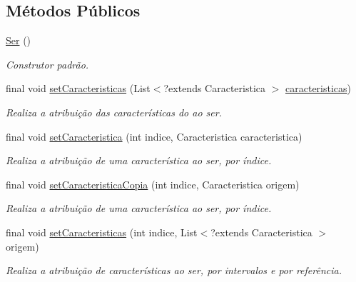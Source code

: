 \subsection*{Métodos Públicos}
\begin{DoxyCompactItemize}
\item 
\hyperlink{classic_1_1populacional_1_1_ser_3_01_g_01extends_01_number_01_6_comparable_3_01_g_01_4_01_4_ae72fa111fcce2c22172418ee5d1d8b29}{Ser} ()
\begin{DoxyCompactList}\small\item\em Construtor padrão. \end{DoxyCompactList}\item 
final void \hyperlink{classic_1_1populacional_1_1_ser_3_01_g_01extends_01_number_01_6_comparable_3_01_g_01_4_01_4_ad7fd5259dec5570a2bcfc659bd9395af}{set\-Caracteristicas} (List$<$?extends Caracteristica $>$ \hyperlink{classic_1_1populacional_1_1_ser_3_01_g_01extends_01_number_01_6_comparable_3_01_g_01_4_01_4_af3bf3cd92507f965583db83b92f010ef}{caracteristicas})
\begin{DoxyCompactList}\small\item\em Realiza a atribuição das características do ao ser. \end{DoxyCompactList}\item 
final void \hyperlink{classic_1_1populacional_1_1_ser_3_01_g_01extends_01_number_01_6_comparable_3_01_g_01_4_01_4_a556c6ac4e96ba9a4c39f190711c4619c}{set\-Caracteristica} (int indice, Caracteristica caracteristica)
\begin{DoxyCompactList}\small\item\em Realiza a atribuição de uma característica ao ser, por índice. \end{DoxyCompactList}\item 
final void \hyperlink{classic_1_1populacional_1_1_ser_3_01_g_01extends_01_number_01_6_comparable_3_01_g_01_4_01_4_a93b9c89200b2a1914bacebcfe5ae67b5}{set\-Caracteristica\-Copia} (int indice, Caracteristica origem)
\begin{DoxyCompactList}\small\item\em Realiza a atribuição de uma característica ao ser, por índice. \end{DoxyCompactList}\item 
final void \hyperlink{classic_1_1populacional_1_1_ser_3_01_g_01extends_01_number_01_6_comparable_3_01_g_01_4_01_4_ab6b2a5d4fc091d83ce27f51d4f1ff3a8}{set\-Caracteristicas} (int indice, List$<$?extends Caracteristica $>$ origem)
\begin{DoxyCompactList}\small\item\em Realiza a atribuição de características ao ser, por intervalos e por referência. \end{DoxyCompactList}\item 

\end{DoxyCompactItemize}
